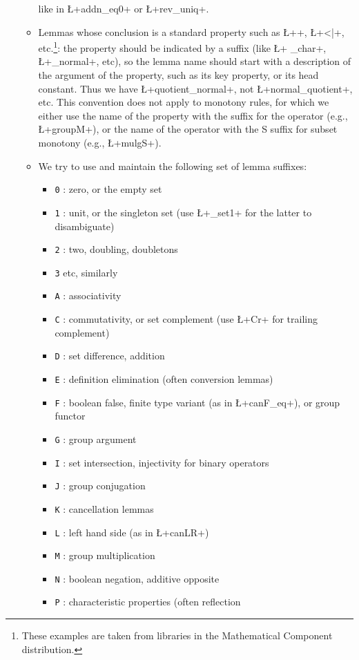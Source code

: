 \begin{itemize}
\begin{itemize}
    like in \L+addn_eq0+ or \L+rev_uniq+.
  \item Lemmas whose conclusion is a standard property such as
    \L+\char+, \L+<|+, etc.\footnote{These examples are taken from
      libraries in the Mathematical Component distribution.}:
    the property should be
    indicated by a suffix (like \L+ _char+, \L+_normal+, etc), so
    the lemma name
    should start with a description of the argument of the property, such as
    its key property, or its head constant.
    Thus we have \L+quotient_normal+, not \L+normal_quotient+, etc. This
    convention does not apply to monotony rules, for which we either
    use the name of the property with the suffix for the operator
    (e.g., \L+groupM+), or the name of the operator with the S
    suffix for subset monotony (e.g., \L+mulgS+).
  \item We try to use and maintain the following set of lemma suffixes:
    \begin{itemize}
    \item {\tt 0} : zero, or the empty set
    \item {\tt 1} : unit, or the singleton set (use \L+_set1+ for
      the latter to disambiguate)
    \item {\tt 2} : two, doubling, doubletons
    \item {\tt 3} etc, similarly
    \item {\tt A} : associativity
    \item {\tt C} : commutativity, or set complement (use \L+Cr+
      for trailing complement)
    \item {\tt D} : set difference, addition
    \item {\tt E} : definition elimination (often conversion
      lemmas)
    \item {\tt F} : boolean false, finite type variant (as in
      \L+canF_eq+), or group functor
    \item {\tt G} : group argument
    \item {\tt I} : set intersection, injectivity for binary operators
    \item {\tt J} : group conjugation
    \item {\tt K} : cancellation lemmas
    \item {\tt L} : left hand side (as in \L+canLR+)
    \item {\tt M} : group multiplication
    \item {\tt N} : boolean negation, additive opposite
    \item {\tt P} : characteristic properties (often reflection

\end{itemize}
\end{itemize}
\end{itemize}

